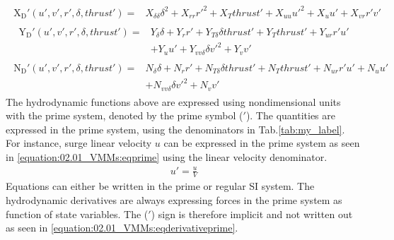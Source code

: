 \begin{equation}\label{equation:02.01_VMMs:eqxmartinssimple}
\begin{split}\begin{split}
\operatorname{X_{D}'}{\left(u',v',r',\delta,thrust' \right)} = & X_{\delta\delta} \delta^{2} + X_{rr} r'^{2} + X_{T} thrust' + X_{uu} u'^{2} + X_{u} u' + X_{vr} r' v' 
\end{split}\end{split}
\end{equation}\begin{equation}\label{equation:02.01_VMMs:eqymartinssimple}
\begin{split}\begin{split}
\operatorname{Y_{D}'}{\left(u',v',r',\delta,thrust' \right)} = & Y_{\delta} \delta + Y_{r} r' + Y_{T\delta} \delta thrust' + Y_{T} thrust' + Y_{ur} r' u' \\ & + Y_{u} u' + Y_{vv\delta} \delta v'^{2} + Y_{v} v' 
\end{split}\end{split}
\end{equation}\begin{equation}\label{equation:02.01_VMMs:eqnmartinssimple}
\begin{split}\begin{split}
\operatorname{N_{D}'}{\left(u',v',r',\delta,thrust' \right)} = & N_{\delta} \delta + N_{r} r' + N_{T\delta} \delta thrust' + N_{T} thrust' + N_{ur} r' u' + N_{u} u' \\ & + N_{vv\delta} \delta v'^{2} + N_{v} v' 
\end{split}\end{split}
\end{equation}
\sphinxAtStartPar
The hydrodynamic functions above are expressed using nondimensional units with the prime system, denoted by the prime symbol (\('\)). The quantities are expressed in the prime system, using the denominators in Tab.\ref{tab:my_label}. For instance, surge linear velocity \(u\) can be expressed in the prime system as seen in \autoref{equation:02.01_VMMs:eqprime} using the linear velocity denominator.
\begin{equation}\label{equation:02.01_VMMs:eqprime}
\begin{split}\displaystyle u'=\frac{u}{V}\end{split}
\end{equation}
\sphinxAtStartPar
Equations can either be written in the prime or regular SI system. The hydrodynamic derivatives are always expressing forces in the prime system as function of state variables. The (\('\)) sign is therefore implicit and not written out as seen in \autoref{equation:02.01_VMMs:eqderivativeprime}.
